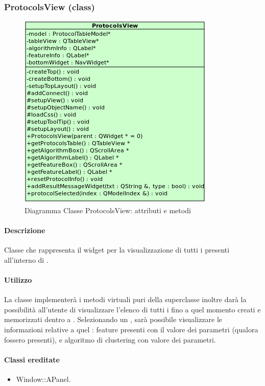 \subsubsection{ProtocolsView (class)}
\label{speproV}
\begin{figure}[!h]
\centering
			\includegraphics[width=0.5\linewidth]{./Content/Immagini/view/ProtocolsView.png}
			\caption{Diagramma Classe ProtocolsView: attributi e metodi}
			\label{cl_proview}
\end{figure}
\paragraph{Descrizione \\}
Classe che rappresenta il widget per la visualizzazione di tutti i \protocol{} presenti all'interno di \project.
\paragraph{Utilizzo\\}
La classe implementerà i metodi virtuali puri della superclasse inoltre darà la possibilità all'utente di visualizzare l'elenco di tutti i \protocol{} fino a quel momento creati e memorizzati dentro a \project. Selezionando un \protocol{}, sarà possibile visualizzare le informazioni relative a quel \protocol{}: feature\g{} presenti con il valore dei parametri (qualora fossero presenti), e algoritmo di clustering\g{} con valore dei parametri.
\paragraph{Classi ereditate\\}
\begin{itemize}
\item Window::APanel.
\end{itemize}
